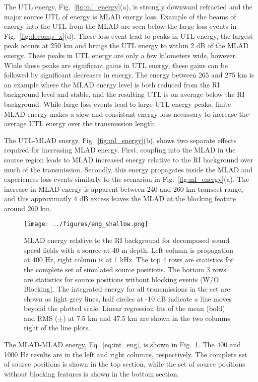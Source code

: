\documentclass[preprint,NumberedRefs]{JASA}
\begin{document}
The UTL energy, Fig.~\ref{fig:ml_energy}(a), is strongly downward refracted and the major source UTL of energy is MLAD energy loss. Example of the beams of energy into the UTL from the MLAD are seen below the large loss events in Fig.~\ref{fig:decomp_x}(d). These loss event lead to peaks in UTL energy, the largest peak occurs at 250 km and brings the UTL energy to within 2 dB of the MLAD energy. These peaks in UTL energy are only a few kilometers wide, however. While these peaks are significant gains in UTL energy, these gains can be followed by significant decreases in energy. The energy between 265 and 275 km is an example where the MLAD energy level is both reduced from the RI background level and stable, and the resulting UTL is on average below the RI background. While large loss events lead to large UTL energy peaks, finite MLAD energy makes a slow and consistant energy loss necassary to increase the average UTL energy over the transmission length.

The UTL-MLAD energy, Fig.~\ref{fig:ml_energy}(b), shows two separate effects required for increasing MLAD energy. First, coupling into the MLAD in the source region leads to MLAD increased energy relative to the RI background over much of the transmission. Secondly, this energy propagates inside the MLAD and experiences loss events similarly to the scenarion in Fig.~\ref{fig:ml_energy}(a). The increase in MLAD energy is apparent between 240 and 260 km transcet range, and this approximatly 4 dB excess leaves the MLAD at the blocking feature around 260 km.

\begin{figure}
\texttt{[image: ../figures/eng\_shallow.png]}
    \caption{MLAD energy relative to the RI background for decomposed sound speed fields with a source at 40 m depth. Left column is propagation at 400 Hz, right column is at 1 kHz. The top 4 rows are statistics for the complete set of simulated source positions. The bottom 3 rows are statistics for source positions without blocking events (W/O Blocking). The integrated energy for all transmissions in the set are shown as light grey lines, half circles at -10 dB indicate a line moves beyond the plotted scale. Linear regression fits of the mean (bold) and RMS ($\pm$) at 7.5 km and 47.5 km are shown in the two columns right of the line plots.}
    \label{fig:shal_eng}
\end{figure}
The MLAD-MLAD energy, Eq.~\eqref{eq:int_eng}, is shown in Fig.~\ref{fig:shal_eng}. The 400 and 1000 Hz results are in the left and right columns, respectively. The complete set of source positions is shown in the top section, while the set of source positions without blocking features is shown in the bottom section.
\end{document}
